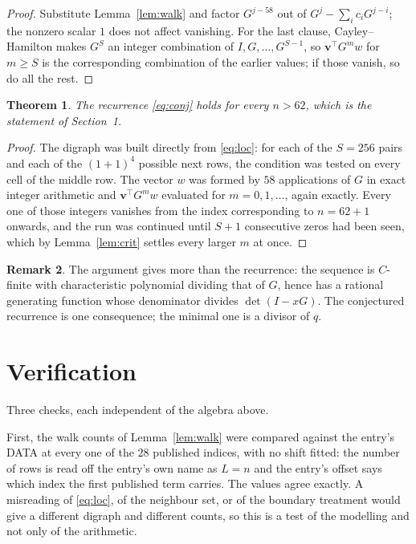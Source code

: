 \documentclass[11pt,a4paper]{article}
\theoremstyle{plain}
\newtheorem{theorem}{Theorem}
\theoremstyle{definition}
\newtheorem{remark}[theorem]{Remark}
\begin{document}
\begin{proof}
Substitute Lemma~\ref{lem:walk} and factor $G^{j-58}$ out of
$G^{j}-\sum_ic_iG^{j-i}$; the nonzero scalar $1$ does not affect
vanishing. For the last clause, Cayley--Hamilton makes $G^{S}$ an integer combination of
$I,G,\dots,G^{S-1}$, so $\mathbf{v}^{\!\top}G^{m}w$ for $m\ge S$ is the corresponding
combination of the earlier values; if those vanish, so do all the rest.
\end{proof}

\begin{theorem}
The recurrence \eqref{eq:conj} holds for every $n>62$, which is the statement of
Section~1.
\end{theorem}

\begin{proof}
The digraph was built directly from \eqref{eq:loc}: for each of the $S=256$ pairs and each
of the $(1+1)^{4}$ possible next rows, the condition was tested on every cell of
the middle row. The vector $w$ was formed by $58$ applications of $G$ in exact integer
arithmetic and $\mathbf{v}^{\!\top}G^{m}w$ evaluated for $m=0,1,\dots$, again exactly.
Every one of those integers vanishes from the index corresponding to $n=62+1$ onwards,
and the run was continued until $S+1$ consecutive zeros had been seen, which by
Lemma~\ref{lem:crit} settles every larger $m$ at once.
\end{proof}

\begin{remark}
The argument gives more than the recurrence: the sequence is $C$-finite with characteristic
polynomial dividing that of $G$, hence has a rational generating function whose denominator
divides $\det(I-xG)$. The conjectured recurrence is one consequence; the minimal one is a
divisor of $q$.
\end{remark}

\section{Verification}

Three checks, each independent of the algebra above.

First, the walk counts of Lemma~\ref{lem:walk} were compared against the entry's DATA at
every one of the $28$ published indices, with no shift fitted: the number of rows is
read off the entry's own name as $L=n$ and the entry's offset says which index the first
published term carries. The values agree exactly. A misreading of \eqref{eq:loc}, of the
neighbour set, or of the boundary treatment would give a different digraph and different
counts, so this is a test of the modelling and not only of the arithmetic.
\end{document}
